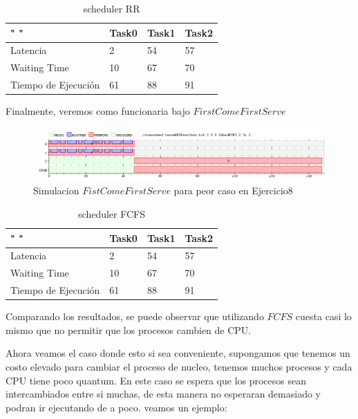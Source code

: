 \documentclass[11pt]{article}
\begin{document}
  \begin{table}[htb]
  \centering
  \begin{tabular}{| l | l | l | l |}
  \hline
  " " & Task0 & Task1 & Task2 \\
  \hline \hline
  Latencia & 2 & 54 & 57 \\ \hline
  Waiting Time & 10 & 67 & 70 \\ \hline
  Tiempo de Ejecución & 61 & 88 & 91 \\ \hline
  \end{tabular}
  \caption{scheduler RR}
  \end{table}

Finalmente, veremos como funcionaria bajo $First Come First Serve$

  \begin{figure}[H]
    \includegraphics[scale=0.5]{Ej8PeorCasoFCFS}
    \caption{Simulacion $Fist Come First Serve$ para peor caso en Ejercicio8}
  \end{figure}

  \begin{table}[htb]
  \centering
  \begin{tabular}{| l | l | l | l |}
  \hline
  " " & Task0 & Task1 & Task2 \\
  \hline \hline
  Latencia & 2 & 54 & 57 \\ \hline
  Waiting Time & 10 & 67 & 70 \\ \hline
  Tiempo de Ejecución & 61 & 88 & 91 \\ \hline
  \end{tabular}
  \caption{scheduler FCFS}
  \end{table}

Comparando los resultados, se puede observar que utilizando $FCFS$ cuesta casi lo mismo que no permitir que los procesos cambien de CPU.


Ahora veamos el caso donde esto si sea conveniente, supongamos que tenemos un costo elevado para cambiar el proceso de nucleo, tenemos muchos procesos y cada CPU tiene poco quantum. En este caso se espera que los procesos sean intercambiados entre si muchas, de esta manera no esperaran demasiado y podran ir ejecutando de a poco. veamos un ejemplo:
\end{document}
